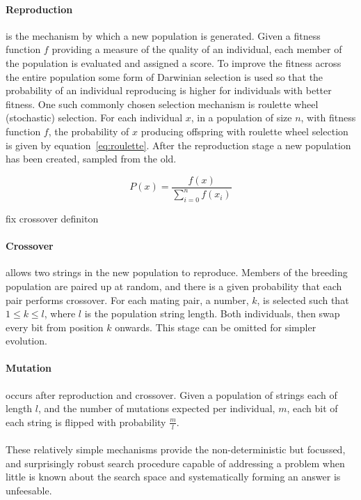 \paragraph{Reproduction}
is the mechanism by which a new population is generated. Given a fitness function
$f$ providing a measure of the quality of an individual, each member of the
population is evaluated and
assigned a score. To improve the fitness across the entire population some form
of Darwinian selection is used so that the probability of an individual
reproducing is higher for individuals with better fitness.
One such commonly chosen selection mechanism is roulette wheel (stochastic) selection.
For each individual $x$, in a population of size $n$, with fitness function $f$,
the probability of $x$ producing offspring with roulette wheel
selection is given by equation~\ref{eq:roulette}. After the reproduction
stage a new population has been created, sampled from the old.

\begin{equation}
	P(x) = \frac{f(x)}{\sum_{i=0}^{n}f(x_{i})}
	\label{eq:roulette}
\end{equation}

\todo fix crossover definiton

\paragraph{Crossover}
allows two strings in the new population to reproduce. Members of the breeding
population are paired up at random, and there is a given probability that each
pair performs crossover. For each mating pair, a number, $k$,
is selected such that $1 \leq k \leq l$, where $l$ is the population string length.
Both individuals, then swap every bit from position $k$ onwards. This stage can be
omitted for simpler evolution.

\paragraph{Mutation}
occurs after reproduction and crossover. Given a population of strings each of length
$l$, and the number of mutations expected per individual, $m$, each bit of each string
is flipped with probability $\frac{m}{l}$.

\paragraph{}
These relatively simple mechanisms provide the non-deterministic but focussed,
and surprisingly robust search procedure capable of addressing a problem when
little is known about the search space and systematically forming an answer is
unfeesable.

